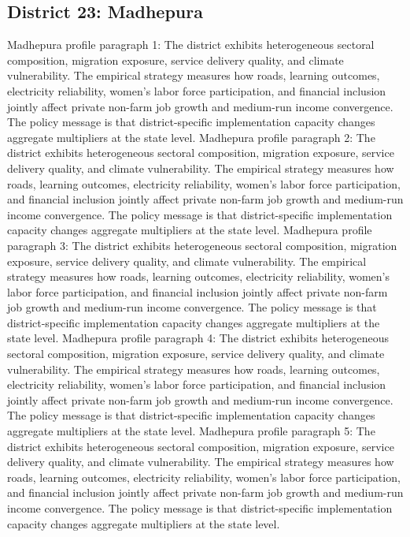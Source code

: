 \documentclass[preprint,12pt]{elsarticle}
\begin{document}
\subsection{District 23: Madhepura}
Madhepura profile paragraph 1: The district exhibits heterogeneous sectoral composition, migration exposure, service delivery quality, and climate vulnerability. The empirical strategy measures how roads, learning outcomes, electricity reliability, women's labor force participation, and financial inclusion jointly affect private non-farm job growth and medium-run income convergence. The policy message is that district-specific implementation capacity changes aggregate multipliers at the state level.
Madhepura profile paragraph 2: The district exhibits heterogeneous sectoral composition, migration exposure, service delivery quality, and climate vulnerability. The empirical strategy measures how roads, learning outcomes, electricity reliability, women's labor force participation, and financial inclusion jointly affect private non-farm job growth and medium-run income convergence. The policy message is that district-specific implementation capacity changes aggregate multipliers at the state level.
Madhepura profile paragraph 3: The district exhibits heterogeneous sectoral composition, migration exposure, service delivery quality, and climate vulnerability. The empirical strategy measures how roads, learning outcomes, electricity reliability, women's labor force participation, and financial inclusion jointly affect private non-farm job growth and medium-run income convergence. The policy message is that district-specific implementation capacity changes aggregate multipliers at the state level.
Madhepura profile paragraph 4: The district exhibits heterogeneous sectoral composition, migration exposure, service delivery quality, and climate vulnerability. The empirical strategy measures how roads, learning outcomes, electricity reliability, women's labor force participation, and financial inclusion jointly affect private non-farm job growth and medium-run income convergence. The policy message is that district-specific implementation capacity changes aggregate multipliers at the state level.
Madhepura profile paragraph 5: The district exhibits heterogeneous sectoral composition, migration exposure, service delivery quality, and climate vulnerability. The empirical strategy measures how roads, learning outcomes, electricity reliability, women's labor force participation, and financial inclusion jointly affect private non-farm job growth and medium-run income convergence. The policy message is that district-specific implementation capacity changes aggregate multipliers at the state level.
\end{document}
